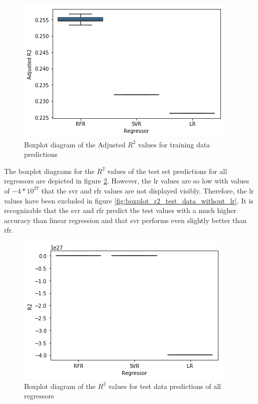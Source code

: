 \documentclass[a4paper, 11pt, oneside]{Thesis}  %
\begin{document}
\begin{figure}[h]
\includegraphics[scale=0.7]{Figures/Regressor_comparison/boxplot_adj_r2_training_data.png}
\centering
\caption{Boxplot diagram of the Adjusted $R^2$ values for training data predictions}
\label{fig:boxplot_adj_r2_training_data}
\end{figure}

The boxplot diagrams for the $R^2$ values of the test set predictions for all regressors are depicted in figure \ref{fig:boxplot_r2_test_data_all}. However, the \ac{lr} values are so low with values of $-4 * 10^27$ that the \ac{svr} and \ac{rfr} values are not displayed visibly. Therefore, the \ac{lr} values have been excluded in figure \ref{fig:boxplot_r2_test_data_without_lr}. It is recognizable that the \ac{svr} and \ac{rfr} predict the test values with a much higher accuracy than linear regression and that \ac{svr} performs even slightly better than \ac{rfr}.

\begin{figure}[h]
\includegraphics[scale=0.7]{Figures/Regressor_comparison/boxplot_r2_test_data_all.png}
\centering
\caption{Boxplot diagram of the $R^2$ values for test data predictions of all regressors}
\label{fig:boxplot_r2_test_data_all}
\end{figure}
\end{document}

